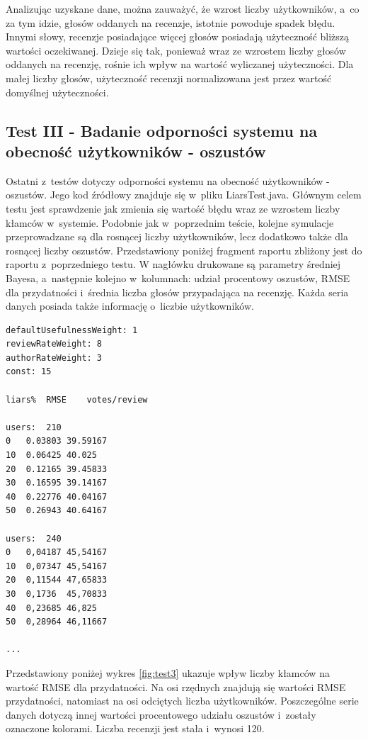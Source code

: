 Analizując uzyskane dane, można zauważyć, że wzrost liczby użytkowników, a~co za tym idzie, głosów oddanych na recenzje, istotnie powoduje spadek błędu. Innymi słowy, recenzje posiadające więcej głosów posiadają użyteczność bliższą wartości oczekiwanej. Dzieje się tak, ponieważ wraz ze wzrostem liczby głosów oddanych na recenzję, rośnie ich wpływ na wartość wyliczanej użyteczności. Dla małej liczby głosów, użyteczność recenzji normalizowana jest przez wartość domyślnej użyteczności.

\subsection{Test III - Badanie odporności systemu na obecność użytkowników - oszustów}

Ostatni z~testów dotyczy odporności systemu na obecność użytkowników - oszustów. Jego kod źródłowy znajduje się w~pliku LiarsTest.java. Głównym celem testu jest sprawdzenie jak zmienia się wartość błędu wraz ze wzrostem liczby kłamców w~systemie. Podobnie jak w~poprzednim teście, kolejne symulacje przeprowadzane są dla rosnącej liczby użytkowników, lecz dodatkowo także dla rosnącej liczby oszustów. Przedstawiony poniżej fragment raportu zbliżony jest do raportu z~poprzedniego testu. W nagłówku drukowane są parametry średniej Bayesa, a~następnie kolejno w~kolumnach: udział procentowy oszustów, RMSE dla przydatności i~średnia liczba głosów przypadająca na recenzję. Każda seria danych posiada także informację o~liczbie użytkowników.

\begin{lstlisting}
defaultUsefulnessWeight: 1
reviewRateWeight: 8
authorRateWeight: 3
const: 15

liars%	RMSE	votes/review

users:	210
0	0.03803	39.59167
10	0.06425	40.025
20	0.12165	39.45833
30	0.16595	39.14167
40	0.22776	40.04167
50	0.26943	40.64167

users:	240	
0	0,04187	45,54167
10	0,07347	45,54167
20	0,11544	47,65833
30	0,1736	45,70833
40	0,23685	46,825
50	0,28964	46,11667

...
\end{lstlisting}

Przedstawiony poniżej wykres \ref{fig:test3} ukazuje wpływ liczby kłamców na wartość RMSE dla przydatności. Na osi rzędnych znajdują się wartości RMSE przydatności, natomiast na osi odciętych liczba użytkowników. Poszczególne serie danych dotyczą innej wartości procentowego udziału oszustów i~zostały oznaczone kolorami. Liczba recenzji jest stała i~wynosi 120.

